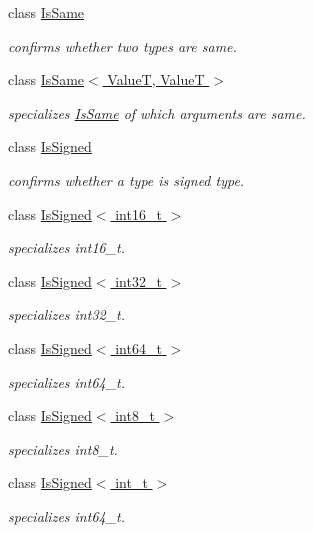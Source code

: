 \begin{DoxyCompactItemize}
class \hyperlink{classhryky_1_1_is_same}{Is\-Same}
\begin{DoxyCompactList}\small\item\em confirms whether two types are same. \end{DoxyCompactList}\item 
class \hyperlink{classhryky_1_1_is_same_3_01_value_t_00_01_value_t_01_4}{Is\-Same$<$ Value\-T, Value\-T $>$}
\begin{DoxyCompactList}\small\item\em specializes \hyperlink{classhryky_1_1_is_same}{Is\-Same} of which arguments are same. \end{DoxyCompactList}\item 
class \hyperlink{classhryky_1_1_is_signed}{Is\-Signed}
\begin{DoxyCompactList}\small\item\em confirms whether a type is signed type. \end{DoxyCompactList}\item 
class \hyperlink{classhryky_1_1_is_signed_3_01int16__t_01_4}{Is\-Signed$<$ int16\-\_\-t $>$}
\begin{DoxyCompactList}\small\item\em specializes int16\-\_\-t. \end{DoxyCompactList}\item 
class \hyperlink{classhryky_1_1_is_signed_3_01int32__t_01_4}{Is\-Signed$<$ int32\-\_\-t $>$}
\begin{DoxyCompactList}\small\item\em specializes int32\-\_\-t. \end{DoxyCompactList}\item 
class \hyperlink{classhryky_1_1_is_signed_3_01int64__t_01_4}{Is\-Signed$<$ int64\-\_\-t $>$}
\begin{DoxyCompactList}\small\item\em specializes int64\-\_\-t. \end{DoxyCompactList}\item 
class \hyperlink{classhryky_1_1_is_signed_3_01int8__t_01_4}{Is\-Signed$<$ int8\-\_\-t $>$}
\begin{DoxyCompactList}\small\item\em specializes int8\-\_\-t. \end{DoxyCompactList}\item 
class \hyperlink{classhryky_1_1_is_signed_3_01int__t_01_4}{Is\-Signed$<$ int\-\_\-t $>$}
\begin{DoxyCompactList}\small\item\em specializes int64\-\_\-t. \end{DoxyCompactList}\item 

\end{DoxyCompactItemize}

